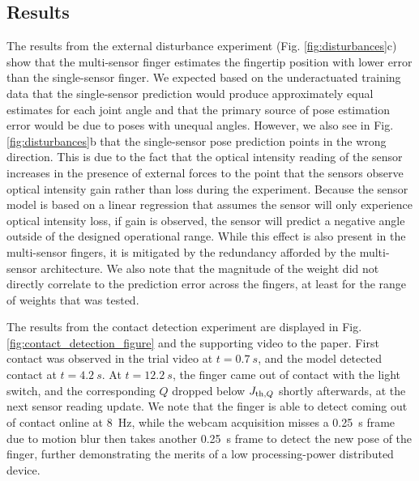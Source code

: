 \subsection{Results}
The results from the external disturbance experiment (Fig. \ref{fig:disturbances}c) show that the multi-sensor finger estimates the fingertip position with lower error than the single-sensor finger. We expected based on the underactuated training data that the single-sensor prediction would produce approximately equal estimates for each joint angle and that the primary source of pose estimation error would be due to poses with unequal angles. However, we also see in Fig. \ref{fig:disturbances}b that the single-sensor pose prediction points in the wrong direction. This is due to the fact that the optical intensity reading of the sensor increases in the presence of external forces to the point that the sensors observe optical intensity gain rather than loss during the experiment. Because the sensor model is based on a linear regression that assumes the sensor will only experience optical intensity loss, if gain is observed, the sensor will predict a negative angle outside of the designed operational range. While this effect is also present in the multi-sensor fingers, it is mitigated by the redundancy afforded by the multi-sensor architecture. We also note that the magnitude of the weight did not directly correlate to the prediction error across the fingers, at least for the range of weights that was tested. 

The results from the contact detection experiment are displayed in Fig. \ref{fig:contact_detection_figure} and the supporting video to the paper. First contact was observed in the trial video at $t=\qty{0.7}{s}$, and the model detected contact at $t=\qty{4.2}{s}$. At $t=\qty{12.2}{s}$, the finger came out of contact with the light switch, and the corresponding $Q$ dropped below $J_{{\rm th,} Q}$ shortly afterwards, at the next sensor reading update. We note that the finger is able to detect coming out of contact online at \qty{8}{Hz}, while the webcam acquisition misses a \qty{0.25}{\s} frame due to motion blur then takes another \qty{0.25}{\s} frame to detect the new pose of the finger, further demonstrating the merits of a low processing-power distributed device. 